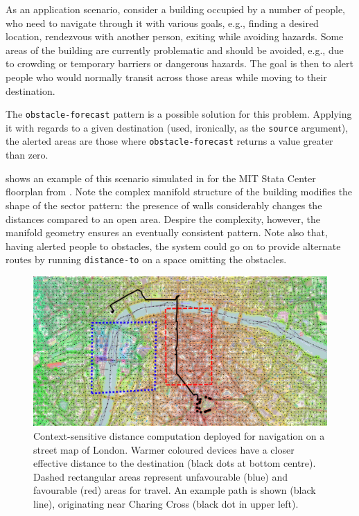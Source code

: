 \documentclass[12pt,a4paper,twoside,openright]{book}
\begin{document}
As an application scenario, consider a building occupied by a number of people, who need to navigate through it with various goals, e.g., finding a desired location, rendezvous with another person, exiting while avoiding hazards.
%
Some areas of the building are currently problematic and should be avoided, e.g., due to crowding or temporary barriers or dangerous hazards.
%
The goal is then to alert people who would normally transit across those areas while moving to their destination.

The {\tt obstacle-forecast} pattern is a possible solution for this problem.  Applying it with regards to a given destination (used, ironically, as the {\tt source} argument), the alerted areas are those where {\tt obstacle-forecast} returns a value greater than zero.

 shows an example of this scenario simulated in \alchemist{} for the MIT Stata Center floorplan from .
%
Note the complex manifold structure of the building modifies the shape of the sector pattern: the presence of walls considerably changes the distances compared to an open area.
%
Despire the complexity, however, the manifold geometry ensures an eventually consistent pattern.  Note also that, having alerted people to obstacles, the system could go on to provide alternate routes by running {\tt distance-to} on a space omitting the obstacles.

\begin{figure}
\centering
\includegraphics[width=\textwidth]{img/london-rc1}
\caption[Context-sensitive distance computation in London]{Context-sensitive distance computation deployed for navigation on a street map of London. Warmer coloured devices have a closer effective distance to the destination (black dots at bottom centre).
%
Dashed rectangular areas represent unfavourable (blue) and favourable (red) areas for travel.  An example path is shown (black line), originating near Charing Cross (black dot in upper left).}
\label{f:urban}
\end{figure}
\end{document}
